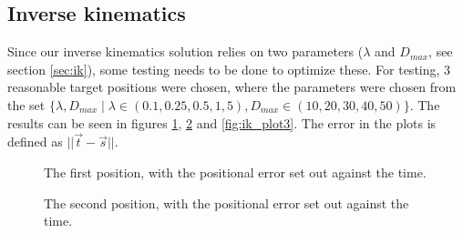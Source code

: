 \documentclass[a4paper]{article}
\begin{document}
\subsection{Inverse kinematics}
\FloatBarrier
Since our inverse kinematics solution relies on two parameters
($\lambda$ and $D_{max}$, see section \ref{sec:ik}), some testing needs to be
done to optimize these. For testing, 3 reasonable target positions were chosen,
where the parameters were chosen from the set $\{\lambda, D_{max} \mid \lambda \in
  (0.1, 0.25, 0.5, 1, 5), D_{max} \in (10, 20, 30, 40, 50)\}$. The results can be
seen in figures \ref{fig:ik_plot1}, \ref{fig:ik_plot2} and \ref{fig:ik_plot3}.
The error in the plots is defined as $|| \vec{t} - \vec{s} ||$.

\begin{figure}[htbp]
  \centering
  \caption{The first position, with the positional error set out against
         the time.}
  \label{fig:ik_plot1}
\end{figure}

\begin{figure}[htbp]
  \centering
  \caption{The second position, with the positional error set out against
         the time.}
  \label{fig:ik_plot2}
\end{figure}
\end{document}

